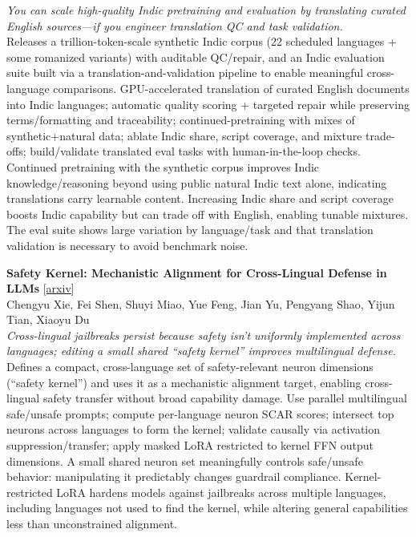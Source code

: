 \documentclass[12pt,letterpaper]{article}
\begin{document}
{\small\textit{You can scale high-quality Indic pretraining and evaluation by translating curated English sources---if you engineer translation QC and task validation.}}\\[1pt]
{\footnotesize Releases a trillion-token-scale synthetic Indic corpus (22 scheduled languages + some romanized variants) with auditable QC/repair, and an Indic evaluation suite built via a translation-and-validation pipeline to enable meaningful cross-language comparisons. GPU-accelerated translation of curated English documents into Indic languages; automatic quality scoring + targeted repair while preserving terms/formatting and traceability; continued-pretraining with mixes of synthetic+natural data; ablate Indic share, script coverage, and mixture trade-offs; build/validate translated eval tasks with human-in-the-loop checks. Continued pretraining with the synthetic corpus improves Indic knowledge/reasoning beyond using public natural Indic text alone, indicating translations carry learnable content. Increasing Indic share and script coverage boosts Indic capability but can trade off with English, enabling tunable mixtures. The eval suite shows large variation by language/task and that translation validation is necessary to avoid benchmark noise.}

\medskip

{\small\textbf{Safety Kernel: Mechanistic Alignment for Cross-Lingual Defense in LLMs}} {\scriptsize[\href{https://arxiv.org/abs/2610.24614}{arxiv}]}\\
{\scriptsize Chengyu Xie, Fei Shen, Shuyi Miao, Yue Feng, Jian Yu, Pengyang Shao, Yijun Tian, Xiaoyu Du}\\

{\small\textit{Cross-lingual jailbreaks persist because safety isn't uniformly implemented across languages; editing a small shared ``safety kernel'' improves multilingual defense.}}\\[1pt]
{\footnotesize Defines a compact, cross-language set of safety-relevant neuron dimensions (``safety kernel'') and uses it as a mechanistic alignment target, enabling cross-lingual safety transfer without broad capability damage. Use parallel multilingual safe/unsafe prompts; compute per-language neuron SCAR scores; intersect top neurons across languages to form the kernel; validate causally via activation suppression/transfer; apply masked LoRA restricted to kernel FFN output dimensions. A small shared neuron set meaningfully controls safe/unsafe behavior: manipulating it predictably changes guardrail compliance. Kernel-restricted LoRA hardens models against jailbreaks across multiple languages, including languages not used to find the kernel, while altering general capabilities less than unconstrained alignment.}
\end{document}
